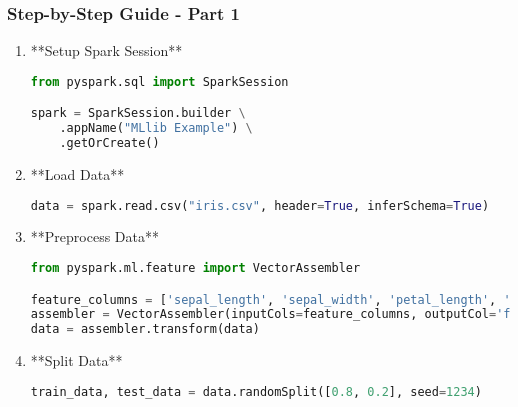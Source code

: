 \documentclass[aspectratio=169]{beamer}
\begin{document}
\begin{frame}[fragile]
    \frametitle{Step-by-Step Guide - Part 1}
    \begin{enumerate}
        \item **Setup Spark Session**
            \begin{lstlisting}[language=Python]
from pyspark.sql import SparkSession

spark = SparkSession.builder \
    .appName("MLlib Example") \
    .getOrCreate()
            \end{lstlisting}

        \item **Load Data**
            \begin{lstlisting}[language=Python]
data = spark.read.csv("iris.csv", header=True, inferSchema=True)
            \end{lstlisting}

        \item **Preprocess Data**
            \begin{lstlisting}[language=Python]
from pyspark.ml.feature import VectorAssembler

feature_columns = ['sepal_length', 'sepal_width', 'petal_length', 'petal_width']
assembler = VectorAssembler(inputCols=feature_columns, outputCol='features')
data = assembler.transform(data)
            \end{lstlisting}

        \item **Split Data**
            \begin{lstlisting}[language=Python]
train_data, test_data = data.randomSplit([0.8, 0.2], seed=1234)
            \end{lstlisting}
    \end{enumerate}
\end{frame}
\end{document}
